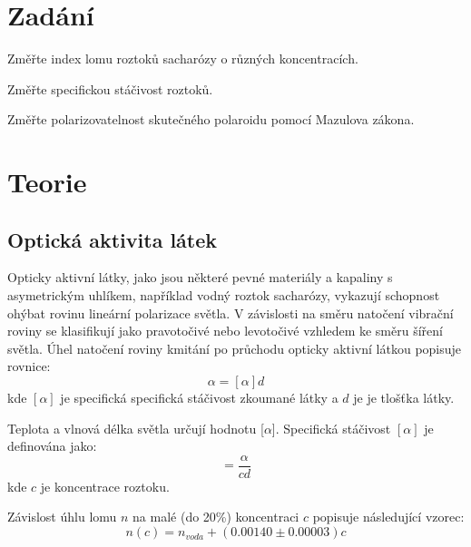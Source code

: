 \documentclass[a4paper,11pt]{article}
\begin{document}
\vskip1cm
    \begin{minipage}[t]{0.5\textwidth} 
        \section{Zadání}
            Změřte index lomu roztoků sacharózy o různých koncentracích. 
            \par Změřte specifickou stáčivost roztoků.
            \par Změřte polarizovatelnost skutečného polaroidu pomocí Mazulova zákona.
        \section{Teorie}
            \subsection{Optická aktivita látek}
                Opticky aktivní látky, jako jsou některé pevné materiály a kapaliny s asymetrickým uhlíkem, například vodný roztok sacharózy, vykazují schopnost ohýbat rovinu lineární polarizace světla. V závislosti na směru natočení vibrační roviny se klasifikují jako pravotočivé nebo levotočivé vzhledem ke směru šíření světla. Úhel natočení roviny kmitání po průchodu opticky aktivní látkou popisuje rovnice:
                \begin{equation}
                    \alpha = [\alpha]d
                \end{equation}
                kde $[\alpha]$ je specifická specifická stáčivost zkoumané látky a $d$ je je tlošťka látky.
                \par Teplota a vlnová délka světla určují hodnotu [$\alpha$]. Specifická stáčivost $[\alpha]$ je definována jako:
                \begin{equation}
                    [\alpha] = \frac{\alpha}{cd}
                \end{equation}
                kde $c$ je koncentrace roztoku.
                \par Závislost úhlu lomu $n$ na malé (do 20\%) koncentraci $c$ popisuje následující vzorec: 
                \begin{equation}
                    n(c) = n_{voda} + (0.00140 \pm 0.00003)c
                \end{equation}
    \end{minipage}
    \hspace{10pt}
\end{document}
